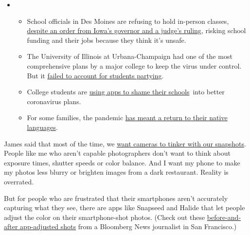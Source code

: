 \begin{itemize}
\item
  \begin{itemize}
  \tightlist
  \item
    School officials in Des Moines are refusing to hold in-person
    classes,
    \href{https://www.nytimes3xbfgragh.onion/2020/09/10/us/des-moines-school-opening-coronavirus.html?action=click\&pgtype=Article\&state=default\&region=MAIN_CONTENT_3\&context=storylines_keepup}{despite
    an order from Iowa's governor and a judge's ruling}, risking school
    funding and their jobs because they think it's unsafe.
  \item
    The University of Illinois at Urbana-Champaign had one of the most
    comprehensive plans by a major college to keep the virus under
    control. But it
    \href{https://www.nytimes3xbfgragh.onion/2020/09/10/health/university-illinois-covid.html?action=click\&pgtype=Article\&state=default\&region=MAIN_CONTENT_3\&context=storylines_keepup}{failed
    to account for students partying}.
  \item
    College students are
    \href{https://www.nytimes3xbfgragh.onion/2020/09/10/technology/coronavirus-quarantines-college.html?action=click\&pgtype=Article\&state=default\&region=MAIN_CONTENT_3\&context=storylines_keepup}{using
    apps to shame their schools}~into better coronavirus plans.
  \item
    For some families, the pandemic
    \href{https://www.nytimes3xbfgragh.onion/2020/09/10/parenting/family-second-language-coronavirus.html?action=click\&pgtype=Article\&state=default\&region=MAIN_CONTENT_3\&context=storylines_keepup}{has
    meant a return to their native languages}.
  \end{itemize}
\end{itemize}

James said that most of the time, we
\href{https://www.washingtonpost.com/technology/2018/11/14/your-smartphone-photos-are-totally-fake-you-love-it/}{want
cameras to tinker with our snapshots}. People like me who aren't capable
photographers don't want to think about exposure times, shutter speeds
or color balance. And I want my phone to make my photos less blurry or
brighten images from a dark restaurant. Reality is overrated.

But for people who are frustrated that their smartphones aren't
accurately capturing what they see, there are apps like Snapseed and
Halide that let people adjust the color on their smartphone-shot photos.
(Check out these
\href{https://twitter.com/sarahfrier/status/1303706996873461760}{before-and-after
app-adjusted shots} from a Bloomberg News journalist in San Francisco.)

